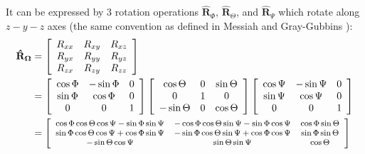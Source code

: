 It can be expressed by 3 rotation operations $\mathbf{\hat{R}}_{\Phi}$,
$\mathbf{\hat{R}}_{\Theta}$, and $\mathbf{\hat{R}}_{\Psi}$ which
rotate along $z-y-z$ axes (the same convention as defined in Messiah
\citep{Messiah} and Gray-Gubbins \citep{Gray-Gubbins}):
\begin{align}
\mathbf{\hat{R}}_{\mathbf{\Omega}} & =\left[\begin{array}{ccc}
R_{xx} & R_{xy} & R_{xz}\\
R_{yx} & R_{yy} & R_{yz}\\
R_{zx} & R_{zy} & R_{zz}
\end{array}\right]\\
 & =\left[\begin{array}{ccc}
\cos\Phi & -\sin\Phi & 0\\
\sin\Phi & \cos\Phi & 0\\
0 & 0 & 1
\end{array}\right]\left[\begin{array}{ccc}
\cos\Theta & 0 & \sin\Theta\\
0 & 1 & 0\\
-\sin\Theta & 0 & \cos\Theta
\end{array}\right]\left[\begin{array}{ccc}
\cos\Psi & -\sin\Psi & 0\\
\sin\Psi & \cos\Psi & 0\\
0 & 0 & 1
\end{array}\right]\nonumber \\
 & =\footnotesize\left[\begin{array}{ccc}
\cos\Phi\cos\Theta\cos\Psi-\sin\Phi\sin\Psi & -\cos\Phi\cos\Theta\sin\Psi-\sin\Phi\cos\Psi & \cos\Phi\sin\Theta\\
\sin\Phi\cos\Theta\cos\Psi+\cos\Phi\sin\Psi & -\sin\Phi\cos\Theta\sin\Psi+\cos\Phi\cos\Psi & \sin\Phi\sin\Theta\\
-\sin\Theta\cos\Psi & \sin\Theta\sin\Psi & \cos\Theta
\end{array}\right]\nonumber 
\end{align}
